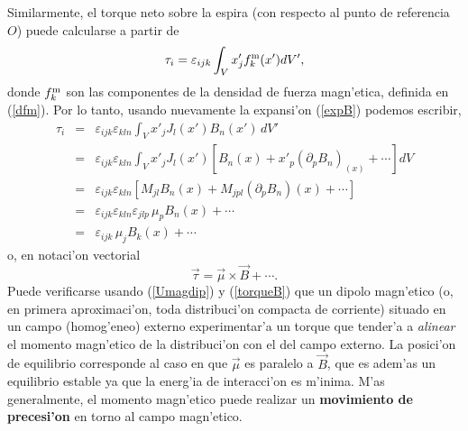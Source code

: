 Similarmente, el torque neto sobre la espira (con respecto al punto de referencia $O$)  puede calcularse a partir de
\begin{equation}
 \tau_i=\varepsilon_{ijk}\int_V x'_j f^{\rm m}_k(x') dV',
\end{equation}
donde $f^{\rm m}_k$ son las componentes de la densidad de fuerza magn'etica,
definida en (\ref{dfm}). Por lo tanto, usando nuevamente la expansi'on
(\ref{expB}) podemos escribir,
\begin{eqnarray}
  \tau_i&=&\varepsilon_{ijk}\varepsilon_{kln}\int_V x'_j J_l(x')B_n(x')\, dV' \\
&=&\varepsilon_{ijk}\varepsilon_{kln}\int_V x'_j
J_l(x')\left[B_n(x)+x'_p(\partial_pB_n)_(x) +\cdots\right] dV \\
&=&\varepsilon_{ijk}\varepsilon_{kln}\left[M_{jl}B_n(x)+M_{jpl}(\partial_pB_n)(x)
+\cdots\right] \\
&=&\varepsilon_{ijk}\varepsilon_{kln}\varepsilon_{jlp}\,\mu_pB_n(x)+\cdots\\
&=&\varepsilon_{ijk}\,\mu_jB_k(x)+\cdots 
\end{eqnarray}
o, en notaci'on vectorial
\begin{equation}
 \boxed{\vec{\tau}=\vec{\mu}\times\vec{B}+\cdots .} \label{torqueB}
\end{equation}
Puede verificarse usando (\ref{Umagdip}) y (\ref{torqueB}) que un dipolo
magn'etico (o, en primera aproximaci'on, toda distribuci'on compacta de
corriente) situado en un campo (homog'eneo) externo experimentar'a un torque
que tender'a a \textit{alinear} el momento magn'etico de la distribuci'on con el
del campo externo. La posici'on de equilibrio corresponde al caso en que
$\vec{\mu}$ es paralelo a $\vec{B}$, que es adem'as un equilibrio estable ya
que la energ'ia de interacci'on es m'inima. M'as generalmente, el momento
magn'etico puede realizar un \textbf{movimiento de precesi'on} en torno al campo
magn'etico.


